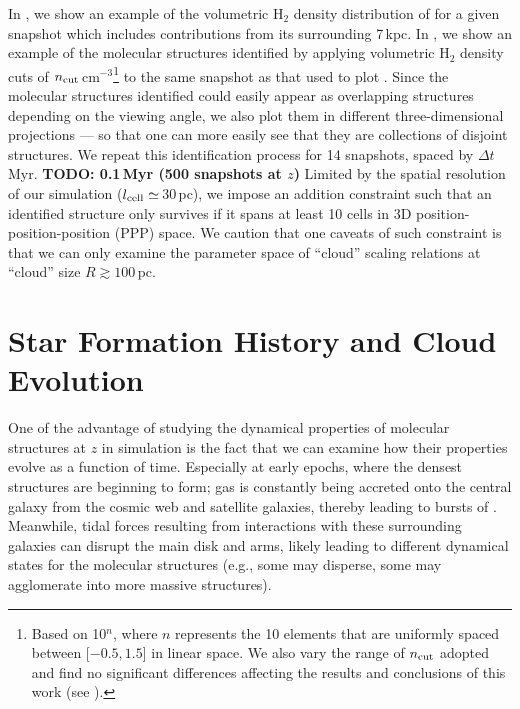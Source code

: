 \documentclass[apj]{emulateapj} %
\begin{document}
In , we show an example of the volumetric H$_2$ density distribution of \flower 
for a given snapshot which includes contributions from its surrounding 7\,kpc.
In , we show an example of
the molecular structures identified by applying volumetric H$_2$ density cuts of 
$n_{\rm cut}$\eq[0.32, 0.53, 0.88, 1.45, 2.45, 4.08, 6.81, 11.36, 19.00, 31.62]\,cm$^{-3}$\footnote{
Based on 10$^n$, where $n$ represents the 10 elements that are 
uniformly spaced between [$-0.5, 1.5$] in linear space.
We also vary the range of 
$n_{\rm cut}$ adopted and find no significant differences 
affecting the results and conclusions of this work (see ).}
to the same snapshot as that 
used to plot .
Since the molecular structures identified could 
easily appear as overlapping structures depending on the viewing angle, we 
also plot them in different three-dimensional projections --- so that one can more 
easily see that they are collections of disjoint structures.
We repeat this identification process for 14 snapshots, spaced by $\Delta t$\,Myr. 
{\bf TODO: 0.1\,Myr (500 snapshots at $z$)}
Limited by the spatial resolution of our simulation ($l_{\rm cell}\simeq$\,30\,pc), we 
impose an addition constraint such that an identified structure only survives if it
spans at least 10 cells in 3D position-position-position (PPP) space. 
We caution that one caveats of such constraint is that 
we can only examine the parameter space of ``cloud'' scaling
relations at ``cloud'' size $R\gtrsim100$\,pc. 



\section{Star Formation History and Cloud Evolution} \label{sec:sfh}

One of the advantage of studying the dynamical properties of molecular structures at 
$z$ in simulation is the fact that we can examine how their properties evolve 
as a function of time. 
Especially at early epochs, where the densest structures are beginning to form; 
gas is constantly being accreted onto the central galaxy from the cosmic web and 
satellite galaxies, thereby leading to bursts of \SF.
Meanwhile, tidal forces resulting from interactions with these surrounding 
galaxies can disrupt the main disk and arms, likely leading to different dynamical states 
for the molecular structures (e.g., some may disperse, some may agglomerate into more massive 
structures). %
\end{document}

